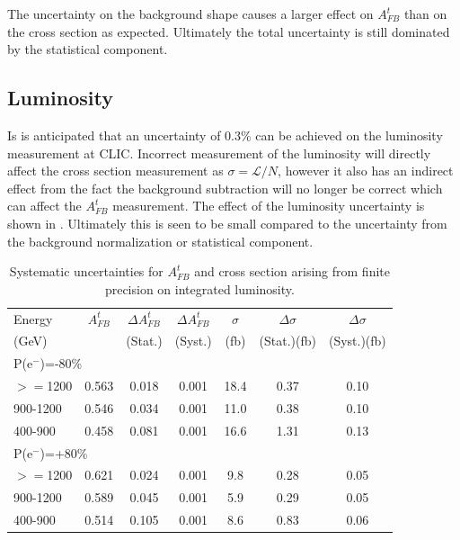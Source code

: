 The uncertainty on the background shape causes a larger effect on $A_{FB}^t$ than on the cross section as expected. Ultimately the total uncertainty is still dominated by the statistical component. 

\subsection{Luminosity}

Is is anticipated that an uncertainty of 0.3\% can be achieved on the luminosity measurement at \ac{CLIC}. Incorrect measurement of the luminosity will directly affect the cross section measurement as $\sigma= \mathcal{L}/N$, however it also has an indirect effect from the fact the background subtraction will no longer be correct which can affect the $A_{FB}^t$ measurement. The effect of the luminosity uncertainty is shown in . Ultimately this is seen to be small compared to the uncertainty from the background normalization or statistical component.

\begin{table}
  \centering
  \begin{tabular}{l|c|c|c|c|c|c}
    \toprule
     Energy & $A_{FB}^t$ & $\Delta A_{FB}^t$  & $\Delta A^t_{FB}$ &  $\sigma$  &  $\Delta\sigma$  &  $\Delta\sigma$ \\
     (GeV) &  & (Stat.) & (Syst.) &  (fb) &  (Stat.)(fb) &  (Syst.)(fb)\\
     \midrule
     \midrule
     \multicolumn{7}{l}{P(e$^-$)=-80\%} \\
     \midrule
     \midrule
    $>=$1200   & 0.563 & 0.018 & 0.001 & 18.4 & 0.37 & 0.10\\
    \midrule
    900-1200   & 0.546 & 0.034 & 0.001 & 11.0 & 0.38 & 0.10\\
    \midrule
    400-900    & 0.458 & 0.081 & 0.001 & 16.6 & 1.31 & 0.13\\
    \midrule
    \midrule
   \multicolumn{7}{l}{ P(e$^-$)=+80\%}\\
    \midrule
    \midrule
    $>=$1200  & 0.621 & 0.024 & 0.001 & 9.8 & 0.28 & 0.05 \\
    \midrule
    900-1200  & 0.589 & 0.045 & 0.001 & 5.9 & 0.29 & 0.05 \\
    \midrule
    400-900   & 0.514 & 0.105 & 0.001 & 8.6 & 0.83 & 0.06 \\
    \bottomrule
  \end{tabular}
  \caption{Systematic uncertainties for $A_{FB}^t$ and cross section arising from finite precision on integrated luminosity.}
  \label{tab:lumisys}
\end{table}


